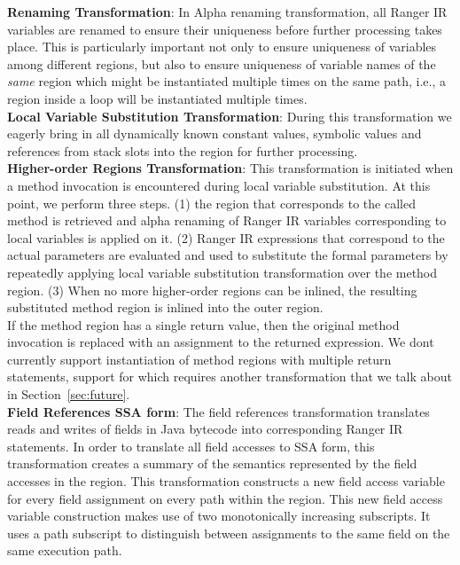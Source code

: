 \textbf{Renaming Transformation}: In Alpha renaming transformation, all Ranger IR variables are renamed to ensure their uniqueness before further processing takes place. 
%
This is particularly important not only to ensure uniqueness of variables among different regions, but also to ensure
uniqueness of variable names of the \textit{same} region which might be instantiated multiple times on the same path,
i.e., a region inside a loop will be instantiated multiple times.\\
%
\textbf{Local Variable Substitution Transformation}: During this transformation we eagerly bring in all dynamically
known constant values, symbolic values and references from stack slots into the region for further processing. \\
%
\textbf{Higher-order Regions Transformation}: This transformation is initiated when a method invocation is encountered
during local variable substitution.
%
At this point, we perform three steps.
%
(1) the region that corresponds to the called method is retrieved and alpha renaming of
Ranger IR variables corresponding to local variables is applied on it.
%
(2) Ranger IR expressions that correspond to the actual parameters are evaluated and used to substitute the formal
parameters by repeatedly applying local variable substitution transformation over the method region.
%
(3) When no more higher-order regions can be inlined, the resulting substituted method region is inlined into
the outer region.\\
%
If the method region has a single return value, then the original method invocation is replaced with an assignment to
the returned expression.
%
%
We dont currently support instantiation of method regions with multiple return statements, support for which requires
another transformation that we talk about in Section~\ref{sec:future}.
\\
\textbf{Field References SSA form}: The field references transformation translates reads and writes of fields
in Java bytecode into corresponding Ranger IR statements.
%
In order to translate all field accesses to SSA form, this transformation creates a summary of the semantics
represented by the field accesses in the region.
%
This transformation constructs a new field access variable for every field assignment on every path within the region.
%
This new field access variable construction makes use of two monotonically increasing subscripts.
%
It uses a path subscript to distinguish between assignments to the same field on the same execution path.
